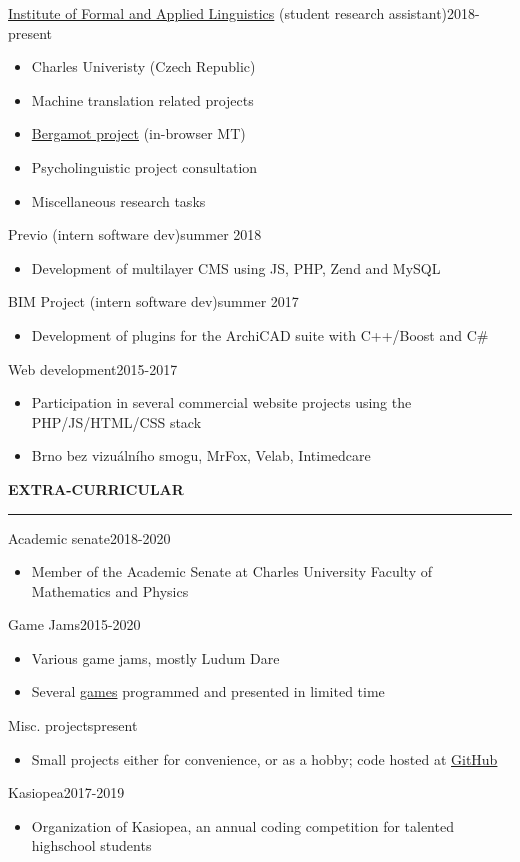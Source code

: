 \documentclass[11pt,a4paper]{article} %
\newcommand{\hSection}[1]{
    \medskip
    \MakeUppercase{\bf #1}
    \medskip
    \hrule
}
\newcommand{\hSubsectionItemize}[3]{
    {#1}\hfill {\footnotesize #2}\hspace{-1cm}\\
    \vspace{-0.5cm}
    \begin{itemize} \footnotesize #3 \end{itemize}
    \vspace{0.3\baselineskip}
}
\begin{document}
\hSubsectionItemize
{\href{https://ufal.mff.cuni.cz}{Institute of Formal and Applied Linguistics} (student research assistant)}
{2018-present}
{
    \item Charles Univeristy (Czech Republic)
    \item Machine translation related projects
    \item \href{https://browser.mt/}{Bergamot project} (in-browser MT)
    \item Psycholinguistic project consultation
    \item Miscellaneous research tasks
}

\hSubsectionItemize
{Previo (intern software dev)}
{summer 2018}
{
    \item Development of multilayer CMS using JS, PHP, Zend and MySQL
}

\hSubsectionItemize
{BIM Project (intern software dev)}
{summer 2017}
{
    \item Development of plugins for the ArchiCAD suite with C++/Boost and C\#
}

\hSubsectionItemize
{Web development}
{2015-2017}
{
\item Participation in several commercial website projects using the PHP/JS/HTML/CSS stack
\item Brno bez vizuálního smogu, MrFox, Velab, Intimedcare 
}

\hSection{Extra-Curricular}
\hSubsectionItemize
{Academic senate}
{2018-2020}
{
\item Member of the Academic Senate at Charles University Faculty of Mathematics and Physics
}

\hSubsectionItemize
{Game Jams}
{2015-2020}
{
\item Various game jams, mostly Ludum Dare
\item Several \href{https://github.com/allemansratten}{games} programmed and presented in limited time
}

\hSubsectionItemize
{Misc. projects}
{present}
{
\item Small projects either for convenience, or as a hobby; code hosted at \href{https://github.com/zouharvi}{GitHub}
}

\hSubsectionItemize
{Kasiopea}
{2017-2019}
{
\item Organization of Kasiopea, an annual coding competition for talented highschool students
}
\end{document}
